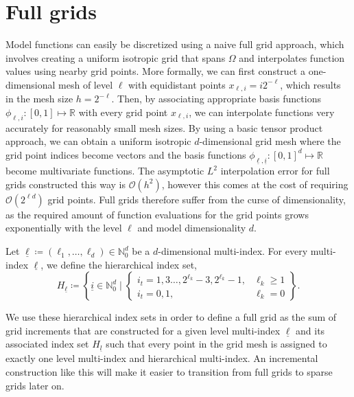 \documentclass[
  a4paper,  %
  twoside,  %
  bibliography=totoc,
  headsepline,
  cleardoublepage=empty,
  parskip=half,
  draft=false
]{scrbook}
\begin{document}
\section{Full grids}

Model functions can easily be discretized using a naive full grid approach, which involves creating a uniform isotropic grid that spans $\Omega$ and interpolates function values using nearby grid points.
More formally, we can first construct a one-dimensional mesh of level $\ell$ with equidistant points $x_{\ell,i}=i2^{-\ell}$, which results in the mesh size $h=2^{-\ell}$.
Then, by associating appropriate basis functions $\phi_{\ell,i} \colon [0,1] \mapsto \mathds{R}$ with every grid point $x_{\ell,i}$, we can interpolate functions very accurately for reasonably small mesh sizes.
By using a basic tensor product approach, we can obtain a uniform isotropic $d$-dimensional grid mesh where the grid point indices become vectors and the basis functions $\phi_{\underline{\ell},\underline{i}} \colon [0,1]^d \mapsto \mathds{R}$ become multivariate functions.
The asymptotic $L^2$ interpolation error for full grids constructed this way is $\mathcal{O}(h^2)$, however this comes at the cost of requiring $\mathcal{O}(2^{\ell d})$ grid points.
Full grids therefore suffer from the curse of dimensionality, as the required amount of function evaluations for the grid points grows exponentially with the level $\ell$ and model dimensionality $d$.

\begin{definition}
Let $\underline{\ell} \coloneqq (\ell_1, \dots, \ell_d) \in \mathds{N}_0^d$ be a $d$-dimensional multi-index.
For every multi-index $\underline{\ell}$, we define the hierarchical index set,
\begin{equation}
H_{\underline{\ell}} \coloneqq \left\{ \underline{i} \in \mathds{N}^d_0 \mid
\begin{cases}
    i_t=1,3\dots,2^{\ell_k} - 3, 2^{\ell_k} - 1, & \ell_k \geq 1 \\
    i_t=0,1, & \ell_k = 0
\end{cases} \right\}.
\end{equation}
\end{definition}
%
We use these hierarchical index sets in order to define a full grid as the sum of grid increments that are constructed for a given level multi-index $\underline{\ell}$ and its associated index set $H_{\underline{l}}$ such that every point in the grid mesh is assigned to exactly one level multi-index and hierarchical multi-index.
An incremental construction like this will make it easier to transition from full grids to sparse grids later on.
\end{document}
